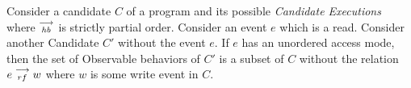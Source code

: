\begin{theorem}
    \label{ReadElim}
    Consider a candidate $C$ of a program and its possible \textit{Candidate Executions} where $\stackrel{\longrightarrow}{_\textit{hb}}$ is strictly partial order. Consider an event $e$ which is a read. Consider another Candidate $C'$ without the event $e$. If $e$ has an unordered access mode, then the set of Observable behaviors of $C'$ is a subset of $C$ without the relation $e\stackrel{\longrightarrow}{_{rf}}w$ where $w$ is some write event in $C$.   
\end{theorem}